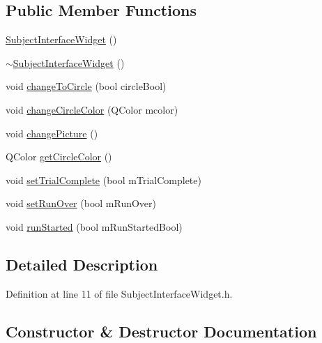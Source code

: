 \subsection*{Public Member Functions}
\begin{DoxyCompactItemize}
\item 
\hyperlink{class_subject_interface_widget_a8dc7dac8e3a7b8aaa13b32f7b6bb8cb3}{Subject\+Interface\+Widget} ()
\item 
\hyperlink{class_subject_interface_widget_a0c93dc94a03c3cd52de4e990f4f54098}{$\sim$\+Subject\+Interface\+Widget} ()
\item 
void \hyperlink{class_subject_interface_widget_aa75bfa1cdd345ca1aaf58ecb554b714c}{change\+To\+Circle} (bool circle\+Bool)
\item 
void \hyperlink{class_subject_interface_widget_aec81ec9335ff92a02dc98703405b076f}{change\+Circle\+Color} (Q\+Color mcolor)
\item 
void \hyperlink{class_subject_interface_widget_a9c31dd56745cd9fe7a97e1d712325e32}{change\+Picture} ()
\item 
Q\+Color \hyperlink{class_subject_interface_widget_acfd75fea03c25d6b6626576db287a606}{get\+Circle\+Color} ()
\item 
void \hyperlink{class_subject_interface_widget_ae7945aaa5eb88265cb8a152617772eb2}{set\+Trial\+Complete} (bool m\+Trial\+Complete)
\item 
void \hyperlink{class_subject_interface_widget_af0c0bb8d6282e6bef4cd082f2063d756}{set\+Run\+Over} (bool m\+Run\+Over)
\item 
void \hyperlink{class_subject_interface_widget_aae6898d55797fec385e60d1d24d85077}{run\+Started} (bool m\+Run\+Started\+Bool)
\end{DoxyCompactItemize}


\subsection{Detailed Description}


Definition at line 11 of file Subject\+Interface\+Widget.\+h.



\subsection{Constructor \& Destructor Documentation}
\mbox{\label{class_subject_interface_widget_a8dc7dac8e3a7b8aaa13b32f7b6bb8cb3}} 
